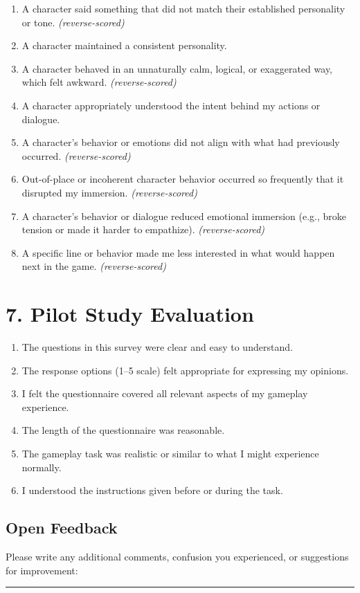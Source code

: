 \documentclass[12pt]{article}
\begin{document}
\begin{enumerate}[resume]
    \item A character said something that did not match their established personality or tone. \textit{(reverse-scored)}
    \item A character maintained a consistent personality.
    \item A character behaved in an unnaturally calm, logical, or exaggerated way, which felt awkward. \textit{(reverse-scored)}
    \item A character appropriately understood the intent behind my actions or dialogue.
    \item A character's behavior or emotions did not align with what had previously occurred. \textit{(reverse-scored)}
    \item Out-of-place or incoherent character behavior occurred so frequently that it disrupted my immersion. \textit{(reverse-scored)}
    \item A character's behavior or dialogue reduced emotional immersion (e.g., broke tension or made it harder to empathize). \textit{(reverse-scored)}
    \item A specific line or behavior made me less interested in what would happen next in the game. \textit{(reverse-scored)}
\end{enumerate}

\section*{7. Pilot Study Evaluation}

\begin{enumerate}[resume]
  \item The questions in this survey were clear and easy to understand.
  \item The response options (1–5 scale) felt appropriate for expressing my opinions.
  \item I felt the questionnaire covered all relevant aspects of my gameplay experience.
  \item The length of the questionnaire was reasonable.
  \item The gameplay task was realistic or similar to what I might experience normally.
  \item I understood the instructions given before or during the task.
\end{enumerate}

\subsection*{Open Feedback}

Please write any additional comments, confusion you experienced, or suggestions for improvement:

\vspace{1.5cm}
\noindent\rule{\textwidth}{0.4pt}
\end{document}
